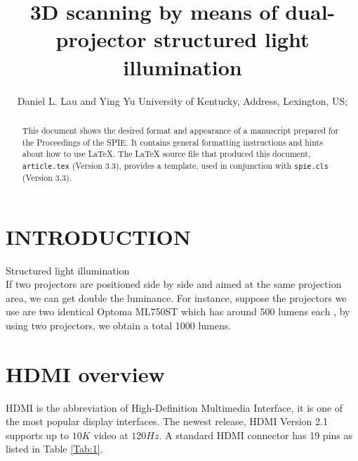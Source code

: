 \documentclass[]{spie}  %
\title{3D scanning by means of dual-projector structured light illumination}
\author{Daniel L. Lau\supit{a} and Ying Yu\supit{a}
\skiplinehalf
\supit{a}University of Kentucky, Address, Lexington, US; \\
}
\begin{document}
 
  \maketitle 

\begin{abstract}
This document shows the desired format and appearance of a manuscript prepared for the Proceedings of the SPIE.  It contains general formatting instructions and hints about how to use LaTeX.  The LaTeX source file that produced this document, {\tt article.tex} (Version 3.3), provides a template, used in conjunction with {\tt spie.cls} (Version 3.3).  
\end{abstract}



\section{INTRODUCTION}
\label{sec:intro}  %
Structured light illumination \\
If two projectors are positioned side by side and aimed at the same projection area, we can get double the luminance. For instance, suppose the projectors we use are two identical Optoma ML750ST which has around 500 lumens each \cite{lume70}, by using two projectors, we obtain a total 1000 lumens.

\section{HDMI overview}
HDMI is the abbreviation of High-Definition Multimedia Interface, it is one of the most popular display interfaces. The newest release, HDMI Version 2.1 supports up to $10K$ video at $120 Hz$. A standard HDMI connector has 19 pins as listed in Table \ref{Tab:1}.
\end{document}
